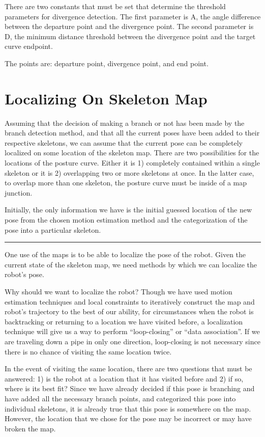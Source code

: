 There are two constants that must be set that determine the threshold parameters for divergence detection. The first parameter is A, the angle difference between the departure point and the divergence point. The second parameter is D, the minimum distance threshold between the divergence point and the target curve endpoint.

The points are: departure point, divergence point, and end point.

\section{Localizing On Skeleton Map}
\label{localizingonskeletonmap}

Assuming that the decision of making a branch or not has been made by the branch detection method, and that all the current poses have been added to their respective skeletons, we can assume that the current pose can be completely localized on some location of the skeleton map. There are two possibilities for the locations of the posture curve. Either it is 1) completely contained within a single skeleton or it is 2) overlapping two or more skeletons at once. In the latter case, to overlap more than one skeleton, the posture curve must be inside of a map junction. 

Initially, the only information we have is the initial guessed location of the new pose from the chosen motion estimation method and the categorization of the pose into a particular skeleton. 

\begin{center}\rule{3in}{0.4pt}\end{center}


One use of the maps is to be able to localize the pose of the robot. Given the current state of the skeleton map, we need methods by which we can localize the robot's pose.

Why should we want to localize the robot? Though we have used motion estimation techniques and local constraints to iteratively construct the map and robot's trajectory to the best of our ability, for circumstances when the robot is backtracking or returning to a location we have visited before, a localization technique will give us a way to perform “loop-closing” or “data association”. If we are traveling down a pipe in only one direction, loop-closing is not necessary since there is no chance of visiting the same location twice. 

In the event of visiting the same location, there are two questions that must be answered: 1) is the robot at a location that it has visited before and 2) if so, where is its best fit? Since we have already decided if this pose is branching and have added all the necessary branch points, and categorized this pose into individual skeletons, it is already true that this pose is somewhere on the map. However, the location that we chose for the pose may be incorrect or may have broken the map.

